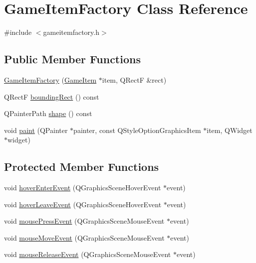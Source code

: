 \hypertarget{class_game_item_factory}{
\section{GameItemFactory Class Reference}
\label{class_game_item_factory}
}


{\ttfamily \#include $<$gameitemfactory.h$>$}

\subsection*{Public Member Functions}
\begin{DoxyCompactItemize}
\item 
\hyperlink{class_game_item_factory_af92f54944e6914ee0312db37d3fcf3f3}{GameItemFactory} (\hyperlink{class_game_item}{GameItem} $\ast$item, QRectF \&rect)
\item 
QRectF \hyperlink{class_game_item_factory_a1737869924dc9fb771e0cdb72bbef491}{boundingRect} () const 
\item 
QPainterPath \hyperlink{class_game_item_factory_a85c5155a56e300a6050907923328aec7}{shape} () const 
\item 
void \hyperlink{class_game_item_factory_acd5074ccfdddfef57243555bfd47f7f7}{paint} (QPainter $\ast$painter, const QStyleOptionGraphicsItem $\ast$item, QWidget $\ast$widget)
\end{DoxyCompactItemize}
\subsection*{Protected Member Functions}
\begin{DoxyCompactItemize}
\item 
void \hyperlink{class_game_item_factory_a87698d1f0b06f0aa3c9057ae24c7c010}{hoverEnterEvent} (QGraphicsSceneHoverEvent $\ast$event)
\item 
void \hyperlink{class_game_item_factory_a9de101e011193a2aa3323f2bbb11661e}{hoverLeaveEvent} (QGraphicsSceneHoverEvent $\ast$event)
\item 
void \hyperlink{class_game_item_factory_a977c2d351f6fa811e4a779eae2fb5f2c}{mousePressEvent} (QGraphicsSceneMouseEvent $\ast$event)
\item 
void \hyperlink{class_game_item_factory_a33e5d9ef6832ffdf0a3dfb3adde07340}{mouseMoveEvent} (QGraphicsSceneMouseEvent $\ast$event)
\item 
void \hyperlink{class_game_item_factory_ac05a87e7d243808faec26339b709da2d}{mouseReleaseEvent} (QGraphicsSceneMouseEvent $\ast$event)
\end{DoxyCompactItemize}
